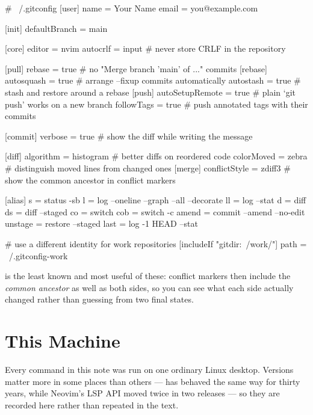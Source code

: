 \begin{conf}
# ~/.gitconfig
[user]
    name  = Your Name
    email = you@example.com

[init]
    defaultBranch = main

[core]
    editor = nvim
    autocrlf = input          # never store CRLF in the repository

[pull]
    rebase = true             # no "Merge branch 'main' of ..." commits
[rebase]
    autosquash = true         # arrange --fixup commits automatically
    autostash  = true         # stash and restore around a rebase
[push]
    autoSetupRemote = true    # plain `git push' works on a new branch
    followTags = true         # push annotated tags with their commits

[commit]
    verbose = true            # show the diff while writing the message

[diff]
    algorithm = histogram     # better diffs on reordered code
    colorMoved = zebra        # distinguish moved lines from changed ones
[merge]
    conflictStyle = zdiff3    # show the common ancestor in conflict markers

[alias]
    s    = status -sb
    l    = log --oneline --graph --all --decorate
    ll   = log --stat
    d    = diff
    ds   = diff --staged
    co   = switch
    cob  = switch -c
    amend = commit --amend --no-edit
    unstage = restore --staged
    last = log -1 HEAD --stat

# use a different identity for work repositories
[includeIf "gitdir:~/work/"]
    path = ~/.gitconfig-work
\end{conf}

\begin{note}
	 is the least known and most useful of these:
	conflict markers then include the \emph{common ancestor} as well as both sides,
	so you can see what each side actually changed rather than guessing from two
	final states.
\end{note}

\chapter{This Machine}\label{app:machine}

Every command in this note was run on one ordinary Linux desktop. Versions
matter more in some places than others ---  has behaved the same way
for thirty years, while Neovim's LSP API moved twice in two releases --- so they
are recorded here rather than repeated in the text.

